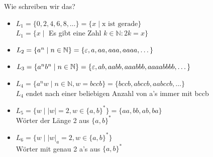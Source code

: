 \begin{frame}[fragile]{Wie schreiben wir das?}
    \begin{itemize}[<+- | alert@+>]
        \item $L_1 = \{0,2,4,6,8,\dots\} = \{x \mid \text{x ist gerade}\}$\\
        $L_1 = \{x \mid$ Es gibt eine Zahl $k \in \mathbb{N} : 2k = x\}$\\
        
        \item $L_2 = \{a^n \mid n \in \mathbb{N}\} = \{\varepsilon, a,aa,aaa,aaaa, \dots\}$
        
        \item $L_3 = \{a^nb^n \mid n \in \mathbb{N}\} = \{\varepsilon, ab ,aabb,aaabbb,aaaabbbb, \dots\}$
        
        \item $L_4 = \{a^nw \mid n \in \mathbb{N}, w = bccb\} = \{bccb, abccb, aabccb, \dots\}$\\
        $L_4$ endet nach einer beliebigen Anzahl von a's immer mit bccb
        
        \item $L_5 = \{w \mid |w| = 2, w\in \{a,b\}^{*}\} = \{aa,bb,ab,ba\}$\\
        Wörter der Länge 2 aus $\{a,b\}^{*}$
        
        \item $L_6 = \{w \mid |w|_a = 2, w\in \{a,b\}^{*}\}$\\
        Wörter mit \alert{genau} 2 a's aus $\{a,b\}^{*}$
    \end{itemize}
\end{frame}

